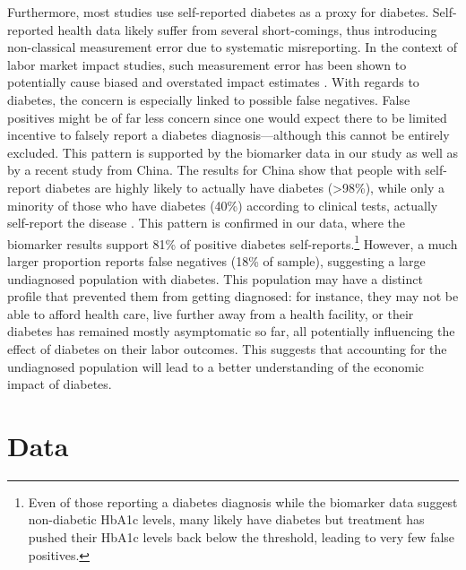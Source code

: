 \documentclass[12pt,english]{article}
\begin{document}
Furthermore, most studies use self-reported diabetes as a proxy for diabetes. Self-reported health data likely suffer from  several short-comings, thus introducing non-classical measurement error due to systematic misreporting. In the context of labor market impact studies, such measurement error has been shown to potentially cause biased and overstated impact estimates \parencite{Cawley2015,ONeill2013,Perks2015}. With regards to diabetes, the concern is especially linked to possible false negatives. False positives might be of far less concern since one would expect there to be limited incentive to falsely report a diabetes diagnosis---although this cannot be entirely excluded. This pattern is supported by the biomarker data in our study as well as by a recent study from China. The results for China show that people with self-report diabetes are highly likely to actually have diabetes (>98\%), while only a minority of those who have diabetes (40\%) according to clinical tests, actually self-report the disease \parencite{Yuan2015}. This pattern is confirmed in our data, where the biomarker results support 81\% of positive diabetes self-reports.\footnote{Even of those reporting a diabetes diagnosis while the biomarker data suggest non-diabetic \ac{HbA1c} levels, many likely have diabetes but treatment has pushed their \ac{HbA1c} levels back below the threshold, leading to very few false positives.}  However, a much larger proportion reports false negatives (18\% of sample), suggesting a large undiagnosed population with diabetes. This population may have a distinct profile that prevented them from getting diagnosed: for instance, they may not be able to afford health care, live further away from a health facility,  or their diabetes has remained mostly asymptomatic so far, all potentially influencing the effect of diabetes on their labor outcomes. This suggests that accounting for the undiagnosed population will lead to a better understanding of the economic impact of diabetes.



\section{\label{sec:Data}Data}
\end{document}
